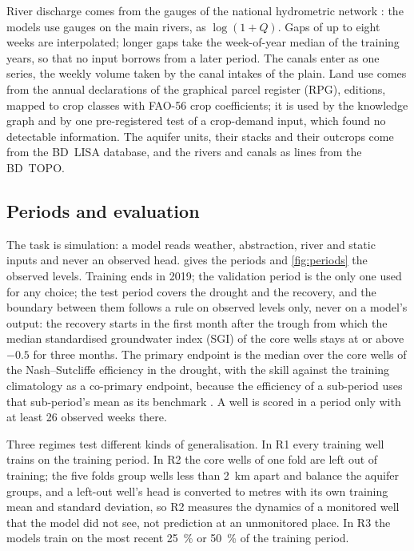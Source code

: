River discharge comes from the gauges of the national hydrometric network
\citep{Hubeau2026Hydrometry}: the models use \nDataGaugesUsed{} gauges on the main rivers, as
$\log(1 + Q)$. Gaps of up to eight weeks are interpolated; longer gaps take the week-of-year median
of the training years, so that no input borrows from a later period. The canals enter as one series,
the weekly volume taken by the canal intakes of the plain. Land use comes from the annual
declarations of the graphical parcel register (RPG), \nDataRpgEditions{} editions, mapped to
crop classes with FAO-56 crop coefficients; it is used by the knowledge graph and by one
pre-registered test of a crop-demand input, which found no detectable information. The aquifer
units, their stacks and their outcrops come from the BD~LISA database, and the rivers and canals as
lines from the BD~TOPO.

\subsection{Periods and evaluation}\label{sec:periods}

The task is simulation: a model reads weather, abstraction, river and static inputs and never an
observed head.  gives the periods and \cref{fig:periods} the observed levels. Training ends in 2019; the validation period
is the only one used for any choice; the test period covers the drought and the recovery, and the
boundary between them follows a rule on observed levels only, never on a model's output: the recovery
starts in the first month after the trough from which the median standardised groundwater index
(SGI) of the core wells stays at or above $-0.5$ for three months. The primary endpoint is the
median over the core wells of the Nash--Sutcliffe efficiency \citep{Nash1970River} in the drought,
with the skill against the training climatology as a co-primary endpoint, because the efficiency of
a sub-period uses that sub-period's mean as its benchmark \citep{Schaefli2007Do}. A well is scored
in a period only with at least 26 observed weeks there.

Three regimes test different kinds of generalisation. In R1 every training well trains on the
training period. In R2 the core wells of one fold are left out of training; the five folds group
wells less than \SI{2}{km} apart \citep{Roberts2017Crossvalidation} and balance the aquifer groups,
and a left-out well's head is converted to metres with its own training mean and standard deviation,
so R2 measures the dynamics of a monitored well that the model did not see, not prediction at an
unmonitored place. In R3 the models train on the most recent \SI{25}{\percent} or \SI{50}{\percent} of
the training period.


